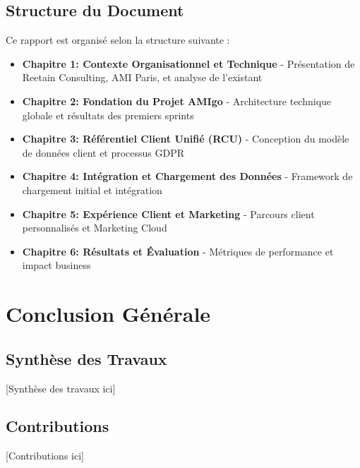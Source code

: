 \documentclass[12pt,a4paper,openany,oneside,draft]{report}
\begin{document}
\section{Structure du Document}
Ce rapport est organisé selon la structure suivante :
\begin{itemize}
    \item \textbf{Chapitre 1: Contexte Organisationnel et Technique} - Présentation de Reetain Consulting, AMI Paris, et analyse de l'existant
    \item \textbf{Chapitre 2: Fondation du Projet AMIgo} - Architecture technique globale et résultats des premiers sprints
    \item \textbf{Chapitre 3: Référentiel Client Unifié (RCU)} - Conception du modèle de données client et processus GDPR
    \item \textbf{Chapitre 4: Intégration et Chargement des Données} - Framework de chargement initial et intégration
    \item \textbf{Chapitre 5: Expérience Client et Marketing} - Parcours client personnalisés et Marketing Cloud
    \item \textbf{Chapitre 6: Résultats et Évaluation} - Métriques de performance et impact business
\end{itemize}

\cleardoublepage


\cleardoublepage


\cleardoublepage


\cleardoublepage


\cleardoublepage


\cleardoublepage


\cleardoublepage
\chapter{Conclusion Générale}
\thispagestyle{plain}

\section{Synthèse des Travaux}
[Synthèse des travaux ici]

\section{Contributions}
[Contributions ici]
\end{document}
